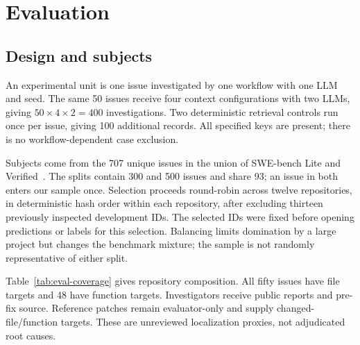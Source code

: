 \section{Evaluation}\label{sec:study}
\subsection{Design and subjects}
An experimental unit is one issue investigated by one workflow with one LLM and seed. The same 50 issues receive four context configurations with two LLMs, giving $50\times4\times2=400$ investigations. Two deterministic retrieval controls run once per issue, giving 100 additional records. All specified keys are present; there is no workflow-dependent case exclusion.

Subjects come from the 707 unique issues in the union of SWE-bench Lite and Verified~\citep{swebench2024,swebenchverified2024}. The splits contain 300 and 500 issues and share 93; an issue in both enters our sample once. Selection proceeds round-robin across twelve repositories, in deterministic hash order within each repository, after excluding thirteen previously inspected development IDs. The selected IDs were fixed before opening predictions or labels for this selection. Balancing limits domination by a large project but changes the benchmark mixture; the sample is not randomly representative of either split.

Table~\ref{tab:eval-coverage} gives repository composition. All fifty issues have file targets and 48 have function targets. Investigators receive public reports and pre-fix source. Reference patches remain evaluator-only and supply changed-file/function targets. These are unreviewed localization proxies, not adjudicated root causes.


